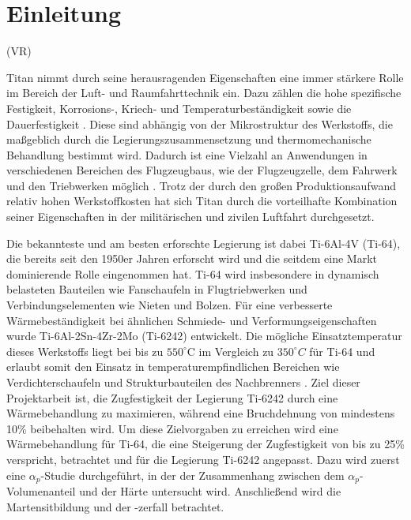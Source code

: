 \chapter{Einleitung} 

(VR)

Titan nimmt durch seine herausragenden Eigenschaften eine immer stärkere Rolle im Bereich der Luft- und Raumfahrttechnik ein. Dazu zählen die hohe spezifische Festigkeit, Korrosions-, Kriech- und Temperaturbeständigkeit sowie die Dauerfestigkeit \cite{Lutjering.2007}. Diese sind abhängig von der Mikrostruktur des Werkstoffs, die maßgeblich durch die Legierungszusammensetzung und thermomechanische Behandlung bestimmt wird. Dadurch ist eine Vielzahl an Anwendungen in verschiedenen Bereichen des Flugzeugbaus, wie der Flugzeugzelle, dem Fahrwerk und den Triebwerken möglich \cite{ASMInternational.2020}. Trotz der durch den großen Produktionsaufwand relativ hohen Werkstoffkosten hat sich Titan durch die vorteilhafte Kombination seiner Eigenschaften in der militärischen und zivilen Luftfahrt durchgesetzt. 

Die bekannteste und am besten erforschte Legierung ist dabei Ti-6Al-4V (Ti-64), die bereits seit den 1950er Jahren erforscht wird und die seitdem eine Markt dominierende Rolle eingenommen hat. Ti-64 wird insbesondere in dynamisch belasteten Bauteilen wie Fanschaufeln in Flugtriebwerken und Verbindungselementen wie Nieten und Bolzen. 
Für eine verbesserte Wärmebeständigkeit bei ähnlichen Schmiede- und Verformungseigenschaften wurde Ti-6Al-2Sn-4Zr-2Mo (Ti-6242) entwickelt. Die mögliche Einsatztemperatur dieses Werkstoffs liegt bei bis zu $550^\circ $C im Vergleich zu $350^\circ C$ für Ti-64 und erlaubt somit den Einsatz in temperaturempfindlichen Bereichen wie Verdichterschaufeln und Strukturbauteilen des Nachbrenners \cite{Lutjering.2007}. 
Ziel dieser Projektarbeit ist, die Zugfestigkeit der Legierung Ti-6242 durch eine Wärmebehandlung zu maximieren, während eine Bruchdehnung von mindestens 10\% beibehalten wird. Um diese Zielvorgaben zu erreichen wird eine Wärmebehandlung für Ti-64, die eine Steigerung der Zugfestigkeit von bis zu 25\% verspricht, betrachtet und für die Legierung Ti-6242 angepasst. Dazu wird zuerst eine $\alpha_p$-Studie durchgeführt, in der der Zusammenhang zwischen dem $\alpha_p$-Volumenanteil und der Härte untersucht wird. Anschließend wird die Martensitbildung und der -zerfall betrachtet. 


